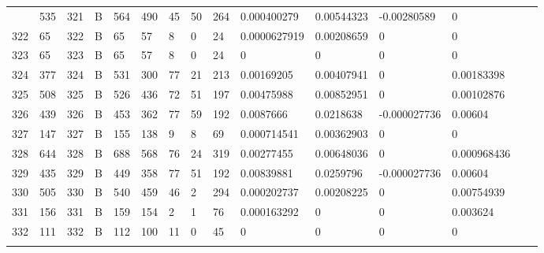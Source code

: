 \begin{longtable}{lllllllllllllll}
\begin{comment}
	321 & 535               & 321 & B   & 564               & 490               & 45                & 50   & 264        & 0.000400279    & 0.00544323     & -0.00280589   & 0            \\
	322 & 65                & 322 & B   & 65                & 57                & 8                 & 0    & 24         & 0.0000627919   & 0.00208659     & 0             & 0            \\
	323 & 65                & 323 & B   & 65                & 57                & 8                 & 0    & 24         & 0              & 0              & 0             & 0            \\
	324 & 377               & 324 & B   & 531               & 300               & 77                & 21   & 213        & 0.00169205     & 0.00407941     & 0             & 0.00183398   \\
	325 & 508               & 325 & B   & 526               & 436               & 72                & 51   & 197        & 0.00475988     & 0.00852951     & 0             & 0.00102876   \\
	326 & 439               & 326 & B   & 453               & 362               & 77                & 59   & 192        & 0.0087666      & 0.0218638      & -0.000027736  & 0.00604      \\
	327 & 147               & 327 & B   & 155               & 138               & 9                 & 8    & 69         & 0.000714541    & 0.00362903     & 0             & 0            \\
	328 & 644               & 328 & B   & 688               & 568               & 76                & 24   & 319        & 0.00277455     & 0.00648036     & 0             & 0.000968436  \\
	329 & 435               & 329 & B   & 449               & 358               & 77                & 51   & 192        & 0.00839881     & 0.0259796      & -0.000027736  & 0.00604      \\
	330 & 505               & 330 & B   & 540               & 459               & 46                & 2    & 294        & 0.000202737    & 0.00208225     & 0             & 0.00754939   \\
	331 & 156               & 331 & B   & 159               & 154               & 2                 & 1    & 76         & 0.000163292    & 0              & 0             & 0.003624     \\
	332 & 111               & 332 & B   & 112               & 100               & 11                & 0    & 45         & 0              & 0              & 0             & 0            \\

\end{comment}
\end{longtable}
